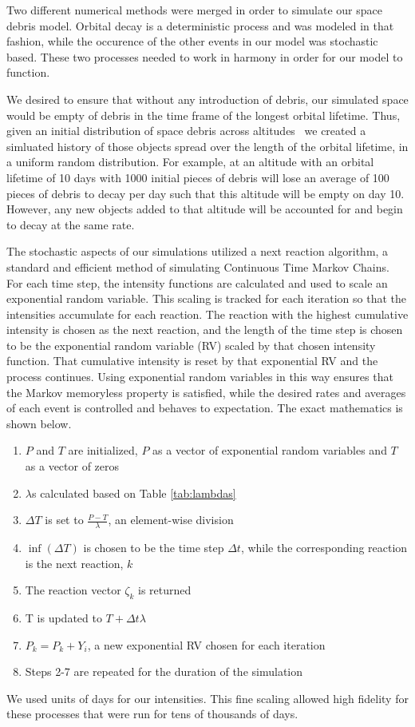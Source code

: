 \documentclass[pre,12pt]{revtex4-1}
\begin{document}
Two different numerical methods were merged in order to simulate our space debris model. Orbital decay is a deterministic process and was modeled in that fashion, while the occurence of the other events in our model was stochastic based. These two processes needed to work in harmony in order for our model to function.

We desired to ensure that without any introduction of debris, our simulated space would be empty of debris in the time frame of the longest orbital lifetime. Thus, given an initial distribution of space debris across altitudes~\cite{orbitalDebris} we created a simluated history of those objects spread over the length of the orbital lifetime, in a uniform random distribution. For example, at an altitude with an orbital lifetime of 10 days with 1000 initial pieces of debris will lose an average of 100 pieces of debris to decay per day such that this altitude will be empty on day 10. However, any new objects added to that altitude will be accounted for and begin to decay at the same rate.

The stochastic aspects of our simulations utilized a next reaction algorithm, a standard and efficient method of simulating Continuous Time Markov Chains. For each time step, the intensity functions are calculated and used to scale an exponential random variable. This scaling is tracked for each iteration so that the intensities accumulate for each reaction. The reaction with the highest cumulative intensity is chosen as the next reaction, and the length of the time step is chosen to be the exponential random variable (RV) scaled by that chosen intensity function. That cumulative intensity is reset by that exponential RV and the process continues. Using exponential random variables in this way ensures that the Markov memoryless property is satisfied, while the desired rates and averages of each event is controlled and behaves to expectation. The exact mathematics is shown below.

\begin{enumerate}
	\item $P$ and $T$ are initialized, $P$ as a vector of exponential random variables and $T$ as a vector of zeros
	\item $\lambda$s calculated based on Table \ref{tab:lambdas}
	\item $\Delta T$ is set to $\frac{P - T}{\lambda}$, an element-wise division
	\item $\inf(\Delta T)$ is chosen to be the time step $\Delta t$, while the corresponding reaction is the next reaction, $k$
	\item The reaction vector $\zeta_k$ is returned
	\item T is updated to $T + \Delta t \lambda$ 
	\item $P_k = P_k + Y_i$, a new exponential RV chosen for each iteration
	\item Steps 2-7 are repeated for the duration of the simulation
\end{enumerate}
We used units of days for our intensities. This fine scaling allowed high fidelity for these processes that were run for tens of thousands of days.
\end{document}
